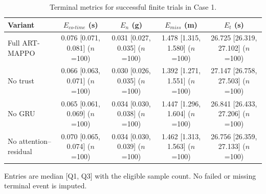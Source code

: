 \begin{table}[!t]
\centering
\small
\caption{Terminal metrics for successful finite trials in Case 1.}
\label{tab:ablation_terminal_case1}
\renewcommand{\arraystretch}{1.12}
\begin{tabular}{lcccc}
\toprule
Variant & $E_{co\text{-}time}$ (s) & $E_n$ (g) & $E_{miss}$ (m) & $E_t$ (s) \\
\midrule
Full ART-MAPPO & 0.076 [0.071, 0.081] ($n$=100) & 0.031 [0.027, 0.035] ($n$=100) & 1.478 [1.315, 1.580] ($n$=100) & 26.725 [26.319, 27.102] ($n$=100) \\
No trust & 0.066 [0.063, 0.071] ($n$=100) & 0.030 [0.026, 0.035] ($n$=100) & 1.392 [1.271, 1.551] ($n$=100) & 27.147 [26.758, 27.503] ($n$=100) \\
No GRU & 0.065 [0.061, 0.069] ($n$=100) & 0.034 [0.030, 0.038] ($n$=100) & 1.447 [1.296, 1.604] ($n$=100) & 26.841 [26.433, 27.206] ($n$=100) \\
No attention--residual & 0.070 [0.065, 0.074] ($n$=100) & 0.034 [0.030, 0.039] ($n$=100) & 1.462 [1.313, 1.563] ($n$=100) & 26.756 [26.359, 27.133] ($n$=100) \\
\bottomrule
\end{tabular}
\vspace{1mm}\parbox{0.98\linewidth}{\footnotesize Entries are median [Q1, Q3] with the eligible sample count. No failed or missing terminal event is imputed.}
\end{table}

